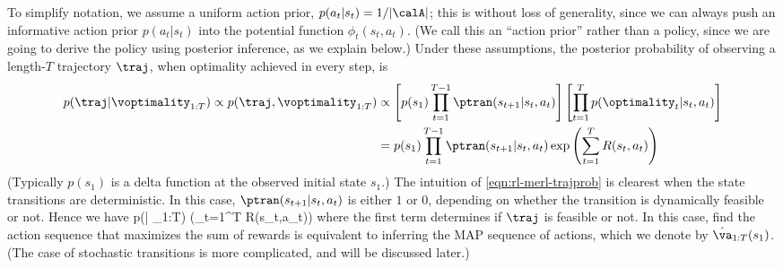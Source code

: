 To simplify notation, we assume a
uniform action prior, $p(a_t|s_t)=1/|\calA|$;
this is without loss of generality,  since we can always push
an informative action prior $p(a_t|s_t)$ into the potential function $\phi_t(s_t,a_t)$.
(We call this an ``action prior'' rather than a policy, since we are going
to derive the policy using posterior inference, as we explain below.)
Under these assumptions, the  posterior probability
of observing a length-$T$ trajectory $\traj$, when optimality achieved in every step, is
\begin{align}
p(\traj | \voptimality_{1:T})
\propto p(\traj, \voptimality_{1:T})
&\propto \left[
p(s_1)  \prod_{t=1}^{T-1} \ptran(s_{t+1}|s_t,a_t)\right]
\left[\prod_{t=1}^{T} p(\optimality_t|s_t,a_t)\right]  \notag \\
&= p(s_1) \prod_{t=1}^{T-1} \ptran(s_{t+1}|s_t,a_t)
\exp\left(\sum_{t=1}^{T} R(s_t,a_t)\right)
\label{eqn:rl-merl-trajprob}
\end{align}
(Typically $p(s_1)$ is a delta function at the observed initial state $s_1$.)
The intuition of \cref{eqn:rl-merl-trajprob} is clearest when the state transitions are deterministic.
In this case, $\ptran(s_{t+1}|s_t,a_t)$ is either $1$ or $0$,
depending on whether the transition is dynamically feasible or not.
Hence we have
\be
p(\traj | \voptimality_{1:T})
\propto {} \exp(\sum_{t=1}^{T} R(s_t,a_t))
\ee
where the first term determines if $\traj$ is feasible or not.
In this case, find the action sequence that maximizes
the sum of rewards is equivalent to inferring the MAP sequence of actions,
which we denote by $\hat{\va}_{1:T}(s_1)$.
(The case of stochastic transitions is more complicated, and will be discussed later.)

